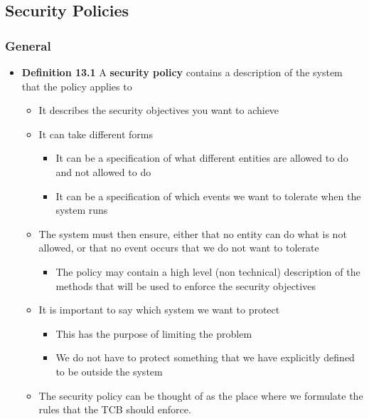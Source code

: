 \documentclass[11pt]{article}
\begin{document}
\subsection{Security Policies}
\label{sec:orgd572e45}
\subsubsection{General}
\label{sec:org0812866}
\begin{itemize}
\item \textbf{Definition 13.1} A \textbf{security policy} contains a description of the system that the policy applies to
\begin{itemize}
\item It describes the security objectives you want to achieve
\item It can take different forms
\begin{itemize}
\item It can be a specification of what different entities are allowed to do and not allowed to do
\item It can be a specification of which events we want to tolerate when the system runs
\end{itemize}
\item The system must then ensure, either that no entity can do what is not allowed, or that no event occurs that we do not want to tolerate
\begin{itemize}
\item The policy may contain a high level (non technical) description of the methods that will be used to enforce the security objectives
\end{itemize}
\item It is important to say which system we want to protect
\begin{itemize}
\item This has the purpose of limiting the problem
\item We do not have to protect something that we have explicitly defined to be outside the system
\end{itemize}
\item The security policy can be thought of as the place where we formulate the rules that the TCB should enforce.
\end{itemize}
\end{itemize}
\end{document}
